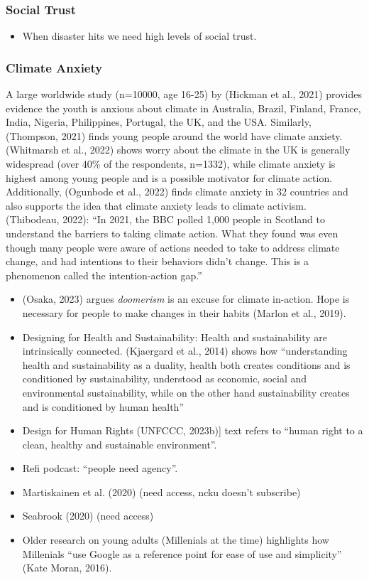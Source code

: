 \documentclass[
  letterpaper,
  DIV=11,
  numbers=noendperiod]{scrartcl}
\providecommand{\tightlist}{%
  \setlength{\itemsep}{0pt}\setlength{\parskip}{0pt}}\usepackage{longtable,booktabs,array}
\begin{document}
\subsubsection{Social Trust}\label{social-trust}

\begin{itemize}
\tightlist
\item
  When disaster hits we need high levels of social trust.
\end{itemize}

\subsubsection{Climate Anxiety}\label{climate-anxiety}

A large worldwide study (n=10000, age 16-25) by (Hickman et al., 2021)
provides evidence the youth is anxious about climate in Australia,
Brazil, Finland, France, India, Nigeria, Philippines, Portugal, the UK,
and the USA. Similarly, (Thompson, 2021) finds young people around the
world have climate anxiety. (Whitmarsh et al., 2022) shows worry about
the climate in the UK is generally widespread (over 40\% of the
respondents, n=1332), while climate anxiety is highest among young
people and is a possible motivator for climate action. Additionally,
(Ogunbode et al., 2022) finds climate anxiety in 32 countries and also
supports the idea that climate anxiety leads to climate activism.
(Thibodeau, 2022): ``In 2021, the BBC polled 1,000 people in Scotland to
understand the barriers to taking climate action. What they found was
even though many people were aware of actions needed to take to address
climate change, and had intentions to their behaviors didn't change.
This is a phenomenon called the intention-action gap.''

\begin{itemize}
\item
  (Osaka, 2023) argues \emph{doomerism} is an excuse for climate
  in-action. Hope is necessary for people to make changes in their
  habits (Marlon et al., 2019).
\item
  Designing for Health and Sustainability: Health and sustainability are
  intrinsically connected. (Kjaergard et al., 2014) shows how
  ``understanding health and sustainability as a duality, health both
  creates conditions and is conditioned by sustainability, understood as
  economic, social and environmental sustainability, while on the other
  hand sustainability creates and is conditioned by human health''
\item
  Design for Human Rights (UNFCCC, 2023b){]} text refers to ``human
  right to a clean, healthy and sustainable environment''.
\item
  Refi podcast: ``people need agency''.
\item
  Martiskainen et al. (2020) (need access, ncku doesn't subscribe)
\item
  Seabrook (2020) (need access)
\item
  Older research on young adults (Millenials at the time) highlights how
  Millenials ``use Google as a reference point for ease of use and
  simplicity'' (Kate Moran, 2016).
\end{itemize}
\end{document}
